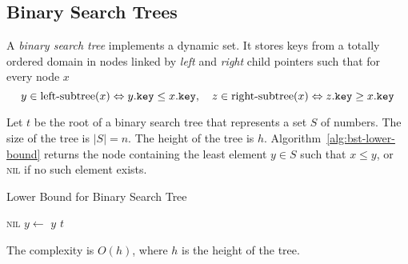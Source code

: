 \subsection{Binary Search Trees}
\label{subsec:bst}

\begin{definition}
A \emph{binary search tree} implements a dynamic set. It stores keys from a totally ordered domain in nodes linked by \emph{left} and \emph{right} child pointers such that for every node \(x\)
\[
y\in\text{left-subtree}(x) \Leftrightarrow  y\mathtt{.}\mathtt{key}\le x\mathtt{.}\mathtt{key}
,\quad
z\in\text{right-subtree}(x)\Leftrightarrow  z\mathtt{.}\mathtt{key}\ge x\mathtt{.}\mathtt{key}
\]
\end{definition}





\begin{example}
  Let $t$ be the root of a binary search tree that represents a set $S$ of numbers. 
  The size of the tree is $|S|=n$. 
  The height of the tree is $h$. Algorithm~\ref{alg:bst-lower-bound} returns the node containing the least element $y \in S$ such that $x \leq y$, or \textsc{nil} if no such element exists.
  
  \begin{algorithm}[htb]
    \caption{Lower Bound for Binary Search Tree}
    \label{alg:bst-lower-bound}
    \begin{algorithmic}[1]
       
      \State \Return \textsc{nil}
      \EndIf
      \State \Return {}
      \Else
      \State $y \gets $ 
      \State \Return $y$
      \Else
      \State \Return $t$
      \EndIf
      \EndIf
      \EndFunction
    \end{algorithmic}
  \end{algorithm}
  The complexity is $O(h)$, where $h$ is the height of the tree. 
  \end{example}
  

